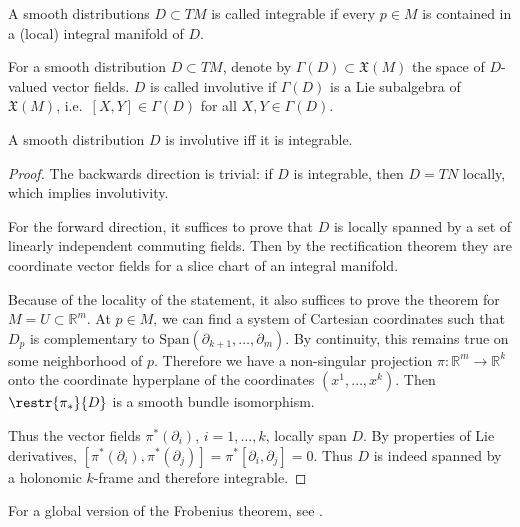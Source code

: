 \documentclass[english,letterpaper]{article}%
\numberwithin{equation}{section}
\numberwithin{figure}{section}
\numberwithin{table}{section}
\theoremstyle{definition}
\theoremstyle{definition}
\theoremstyle{definition}
\theoremstyle{plain}
\theoremstyle{plain}
\theoremstyle{plain}
\theoremstyle{plain}
\theoremstyle{remark}
\theoremstyle{remark}
\newcommand{\fX}{\mathfrak{X}}
\begin{document}
\begin{defn}
    A smooth distributions $D\subset TM$ is called integrable if every $p\in M$ is contained in a (local) integral manifold of $D$.
\end{defn}

\begin{defn}
    For a smooth distribution $D\subset TM$, denote by $\Gamma(D)\subset\fX(M)$ the space of $D$-valued vector fields. $D$ is called involutive if $\Gamma(D)$ is a Lie subalgebra of $\fX(M)$, i.e.\ $[X,Y]\in\Gamma(D)$ for all $X,Y\in\Gamma(D)$.
\end{defn}

\begin{thm}[Frobenius]
    A smooth distribution $D$ is involutive iff it is integrable.
\end{thm}
\begin{proof}
    The backwards direction is trivial: if $D$ is integrable, then $D=TN$ locally, which implies involutivity.

    For the forward direction, it suffices to prove that $D$ is locally spanned by a set of linearly independent commuting fields. Then by the rectification theorem they are coordinate vector fields for a slice chart of an integral manifold.

    Because of the locality of the statement, it also suffices to prove the theorem for $M=U\subset \mathbb{R}^m$. At $p\in M$, we can find a system of Cartesian coordinates such that $D_p$ is complementary to $\mathrm{Span}(\partial_{k+1},\ldots,\partial_m)$. By continuity, this remains true on some neighborhood of $p$. Therefore we have a non-singular projection $\pi:\mathbb{R}^m\to\mathbb{R}^k$ onto the coordinate hyperplane of the coordinates $(x^1,\ldots,x^k)$. Then $\restr{\pi_\ast}{D}$ is a smooth bundle isomorphism.

    Thus the vector fields $\pi^\ast(\partial_i)$, $i=1,\ldots,k$, locally span $D$. By properties of Lie derivatives, $[\pi^\ast(\partial_i),\pi^\ast(\partial_j)]=\pi^\ast[\partial_i,\partial_j]=0.$
    Thus $D$ is indeed spanned by a holonomic $k$-frame and therefore integrable.
\end{proof}

\begin{rem}
    For a global version of the Frobenius theorem, see \cite[Ch. 19]{Lee}.
\end{rem}
\end{document}
